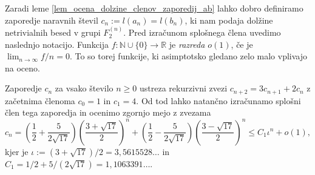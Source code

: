 Zaradi leme \ref{lem_ocena_dolzine_clenov_zaporedij_ab} lahko dobro definiramo zaporedje naravnih števil $c_n := l(a_n) = l(b_n)$, ki nam podaja dolžine netrivialnih besed v grupi $F_2^{(n)}$.
 Pred izračunom splošnega člena uvedimo naslednjo notacijo. Funkcija $f : \mathbb{N} \cup \{ 0 \} \to \mathbb{R}$ je \emph{razreda $o(1)$}, če je $\lim_{n \to \infty} f / n  = 0$. To so torej funkcije, ki asimptotsko gledano
 zelo malo vplivajo na oceno. 
\begin{lema}
\label{lem_vrednost_cn}
Zaporedje $c_n$ za vsako število $n \ge 0$ ustreza rekurzivni zvezi $c_{n+2} = 3 c_{n+1} + 2c_{n}$ z začetnima členoma $c_0 = 1$ in $c_1 = 4$. Od tod lahko natančno izračunamo splošni člen tega zaporedja in ocenimo zgornjo mejo z zvezama \begin{equation*}
c_{n} = \left( \frac{1}{2} + \frac{5}{2 \sqrt{17}} \right) \left( \frac{3 + \sqrt{17} }{2} \right)^{n} +  \left( \frac{1}{2} - \frac{5}{2 \sqrt{17}} \right) \left( \frac{3 - \sqrt{17} }{2} \right)^{n} \le C_1 \iota^{n} + o(1),
\end{equation*}
kjer je $\iota := (3 + \sqrt{17} ) / 2 = 3{,}5615528 \ldots $ in $C_1 = 1/ 2 + 5 / (2 \sqrt{17} ) = 1{,}1063391 \ldots$. 
\end{lema}  
